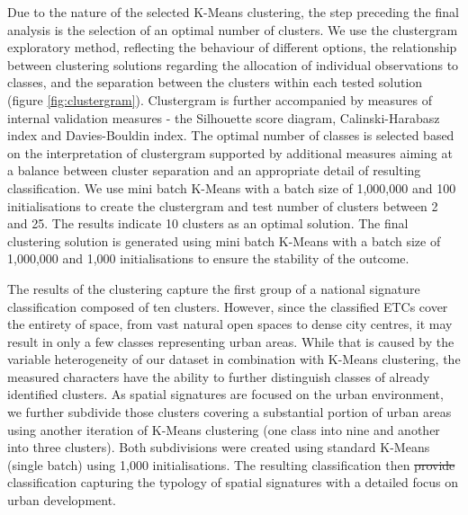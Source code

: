 \documentclass[fleqn,10pt]{wlscirep}
\providecommand{\DIFadd}[1]{{\protect\color{blue}\uwave{#1}}} %
\providecommand{\DIFdel}[1]{{\protect\color{red}\sout{#1}}}                      %
\providecommand{\DIFaddbegin}{} %
\providecommand{\DIFaddend}{} %
\providecommand{\DIFdelbegin}{} %
\providecommand{\DIFdelend}{} %
\begin{document}
Due to the nature of the selected K-Means clustering, the step preceding the final
analysis is the selection of an optimal number of clusters. We use the
clustergram exploratory method\cite{schonlau2002clustergram}, reflecting the behaviour of different options, the relationship
between clustering solutions regarding the allocation of individual observations to
classes, and the separation between the clusters within each tested solution (figure \ref{fig:clustergram}).
Clustergram is further accompanied by measures of internal validation measures - the
Silhouette score diagram, Calinski-Harabasz index\cite{calinski1974} and Davies-Bouldin index\cite{davies1979cluster}. The optimal
number of classes is selected based on the interpretation of clustergram supported by
additional measures aiming at a balance between cluster separation and an appropriate
detail of resulting classification. We use mini batch K-Means with a batch size of 1,000,000
and 100 initialisations to create the clustergram and test number of clusters between 2 and
25. The results indicate 10 clusters as an optimal solution. The final clustering solution
is generated using mini batch K-Means with a batch size of 1,000,000 and 1,000 initialisations
to ensure the stability of the outcome.

The results of the clustering capture the first group of a national signature
classification composed of ten clusters. However, since the classified ETCs
cover the entirety of space, from vast
natural open spaces to dense city centres, it may result in only a few classes
representing urban areas. While that is caused by the variable heterogeneity of our
dataset in combination with K-Means clustering, the measured characters have the ability
to further distinguish classes of already identified clusters. As spatial signatures
are focused on the urban environment, we further subdivide those clusters covering
a substantial portion of urban areas using another iteration of K-Means clustering
(one class into nine and another into three clusters). Both subdivisions were created using
standard K-Means (single batch) using 1,000 initialisations.
The resulting classification then \DIFdelbegin \DIFdel{provide }\DIFdelend \DIFaddbegin \DIFadd{provides a }\DIFaddend classification capturing the typology of
spatial signatures with a detailed focus on urban development.
\end{document}
